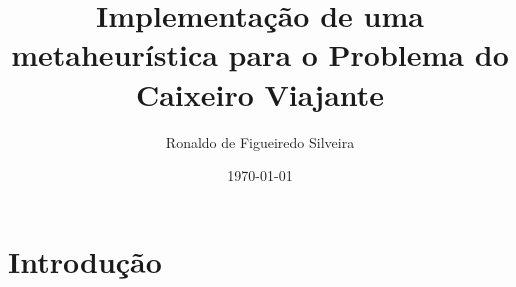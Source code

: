 \documentclass[a4paper]{article}
\title{Implementação de uma metaheurística para o Problema do Caixeiro Viajante}
\author{Ronaldo de Figueiredo Silveira }
\date{\today}
\begin{document}
	\maketitle
    
    
    
    
    \section{Introdução}
    	
        
    
    
\end{document}
